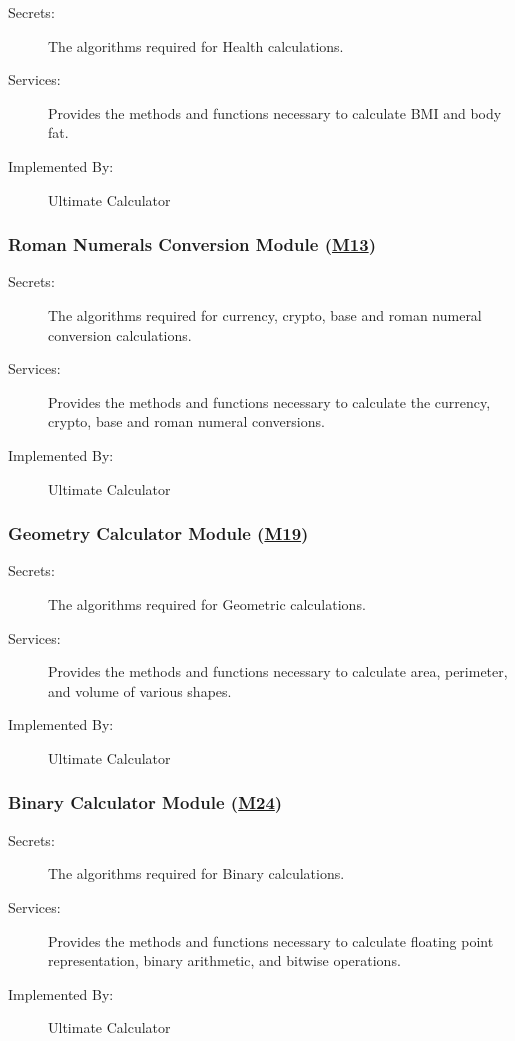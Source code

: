 \documentclass[12pt, titlepage]{article}
\begin{document}
\begin{description}
\item[Secrets:]The algorithms required for Health calculations.
\item[Services:] Provides the methods and functions necessary to calculate BMI and body fat.
\item[Implemented By:] Ultimate Calculator
\end{description}

\subsubsection{Roman Numerals Conversion Module (\hyperref[m13]{M13})}

\begin{description}
\item[Secrets:]The algorithms required for currency, crypto, base and roman numeral conversion calculations.
\item[Services:] Provides the methods and functions necessary to calculate the currency, crypto, base and roman numeral conversions. 
\item[Implemented By:] Ultimate Calculator
\end{description}

\subsubsection{Geometry Calculator Module (\hyperref[m19]{M19})}

\begin{description}
\item[Secrets:]The algorithms required for Geometric calculations.
\item[Services:] Provides the methods and functions necessary to calculate area, perimeter, and volume of various shapes.
\item[Implemented By:] Ultimate Calculator
\end{description}

\subsubsection{Binary Calculator Module (\hyperref[m24]{M24})}

\begin{description}
\item[Secrets:]The algorithms required for Binary calculations.
\item[Services:] Provides the methods and functions necessary to calculate floating point representation, binary arithmetic, and bitwise operations.
\item[Implemented By:] Ultimate Calculator
\end{description}
\end{document}
